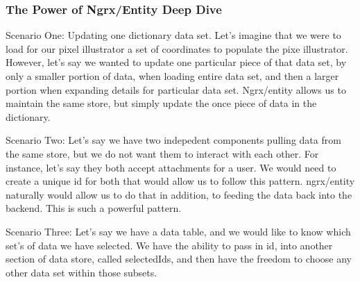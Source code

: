 \subsubsection{The Power of Ngrx/Entity Deep Dive}
Scenario One:
Updating one dictionary data set. Let's imagine that we were to load for our
pixel illustrator a set of coordinates to populate the pixe illustrator. However,
let's say we wanted to update one particular piece of that data set, by only
a smaller portion of data, when loading entire data set, and then a larger portion
when expanding details for particular data set. Ngrx/entity allows us to maintain
the same store, but simply update the once piece of data in the dictionary.

Scenario Two:
Let's say we have two indepedent components pulling data from the same store,
but we do not want them to interact with each other. For instance, let's say they
both accept attachments for a user. We would need to create a unique id for both
that would allow us to follow this pattern. ngrx/entity naturally would allow us
to do that in addition, to feeding the data back into the backend. This is such a
powerful pattern.

Scenario Three:
Let's say we have a data table, and we would like to know which set's of data
we have selected. We have the ability to pass in id, into another section of
data store, called selectedIds, and then have the freedom to choose any other
data set within those subsets.

